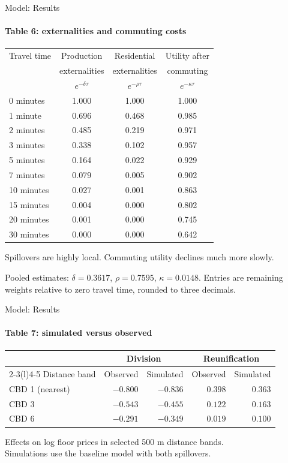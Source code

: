 \documentclass[aspectratio=169,11pt]{beamer}
\begin{document}
\begin{frame}{Model: Results}
\framesubtitle{Table 6: externalities and commuting costs}
  \centering
  \small
  \renewcommand{\arraystretch}{1.2}
  \begin{tabular}{@{}lccc@{}}
    \toprule
    Travel time & Production & Residential & Utility after \\
                & externalities & externalities & commuting \\
                & $e^{-\delta\tau}$ & $e^{-\rho\tau}$ & $e^{-\kappa\tau}$ \\
    \midrule
    0 minutes  & 1.000 & 1.000 & 1.000 \\
    1 minute   & 0.696 & 0.468 & 0.985 \\
    2 minutes  & 0.485 & 0.219 & 0.971 \\
    3 minutes  & 0.338 & 0.102 & 0.957 \\
    5 minutes  & 0.164 & 0.022 & 0.929 \\
    7 minutes  & 0.079 & 0.005 & 0.902 \\
    10 minutes & 0.027 & 0.001 & 0.863 \\
    15 minutes & 0.004 & 0.000 & 0.802 \\
    20 minutes & 0.001 & 0.000 & 0.745 \\
    30 minutes & 0.000 & 0.000 & 0.642 \\
    \bottomrule
  \end{tabular}
  \par\vspace{0.7em}
  Spillovers are highly local. Commuting utility declines much more slowly.
  \par\vspace{0.3em}\scriptsize
  Pooled estimates: $\delta=0.3617$, $\rho=0.7595$, $\kappa=0.0148$.
  Entries are remaining weights relative to zero travel time, rounded to three decimals.
\end{frame}

\begin{frame}{Model: Results}
\framesubtitle{Table 7: simulated versus observed}
  \centering
  \renewcommand{\arraystretch}{1.65}
  \setlength{\tabcolsep}{12pt}
  \begin{tabular}{@{}lrrrr@{}}
    \toprule
      & \multicolumn{2}{c}{Division} & \multicolumn{2}{c}{Reunification} \\
    \cmidrule(lr){2-3}\cmidrule(l){4-5}
    Distance band & Observed & Simulated & Observed & Simulated \\
    \midrule
    CBD 1 (nearest) & $-0.800$ & $-0.836$ & $0.398$ & $0.363$ \\
    CBD 3           & $-0.543$ & $-0.455$ & $0.122$ & $0.163$ \\
    CBD 6           & $-0.291$ & $-0.349$ & $0.019$ & $0.100$ \\
    \bottomrule
  \end{tabular}
  \par\vspace{0.8em}\small
  Effects on log floor prices in selected 500 m distance bands.\\
  Simulations use the baseline model with both spillovers.
\end{frame}
\end{document}
